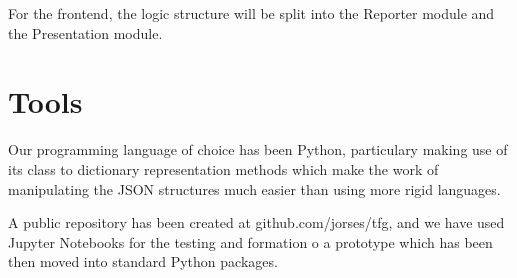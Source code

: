 For the frontend, the logic structure will be split into the Reporter module and the Presentation module.

\section{Tools}
\label{cap1:sec:tools}

Our programming language of choice has been Python, particulary making use of its class to dictionary representation methods which make the work of manipulating the JSON structures much easier than using more rigid languages.

A public repository has been created at github.com/jorses/tfg, and we have used Jupyter Notebooks for the testing and formation o a prototype which has been then moved into standard Python packages.
